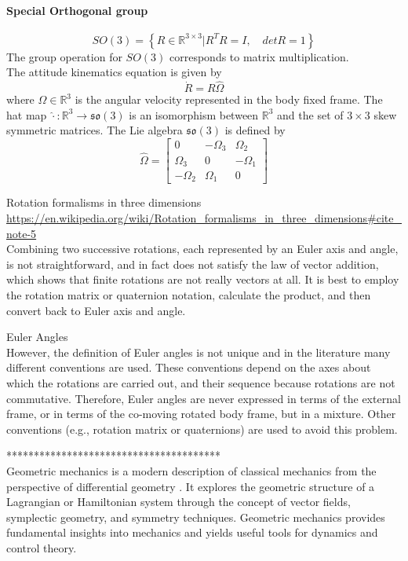 \paragraph{Special Orthogonal group}
\begin{equation}\label{key}
SO(3)=\left\lbrace R\in\mathbb{R}^{3\times3}|R^TR=I,\quad detR=1\right\rbrace 
\end{equation}
The group operation for $ SO(3) $ corresponds to matrix multiplication.\\
The attitude kinematics equation is given by
\begin{equation}\label{key}
\dot{R}=R\hat{\Omega}
\end{equation}
where $ \Omega\in\mathbb{R}^3 $ is the angular velocity represented in the body fixed frame. The hat map $ \hat{\cdot}:\mathbb{R}^3\rightarrow \mathfrak{so}(3)$ is an isomorphism between $ \mathbb{R}^3 $ and the set of $ 3\times 3 $ skew symmetric matrices. The Lie algebra $ \mathfrak{so}(3) $ is defined by
\begin{equation}\label{key}
\hat{\Omega}=\begin{bmatrix}
0&-\Omega_3&\Omega_2\\
\Omega_3&0&-\Omega_1\\
-\Omega_2&\Omega_1&0
\end{bmatrix}
\end{equation}

Rotation formalisms in three dimensions \url{https://en.wikipedia.org/wiki/Rotation_formalisms_in_three_dimensions#cite_note-5}\\
Combining two successive rotations, each represented by an Euler axis and angle, is not straightforward, and in fact does not satisfy the law of vector addition, which shows that finite rotations are not really vectors at all. It is best to employ the rotation matrix or quaternion notation, calculate the product, and then convert back to Euler axis and angle.

Euler Angles\\
However, the definition of Euler angles is not unique and in the literature many different conventions are used. These conventions depend on the axes about which the rotations are carried out, and their sequence because rotations are not commutative. Therefore, Euler angles are never expressed in terms of the external frame, or in terms of the co-moving rotated body frame, but in a mixture. Other conventions (e.g., rotation matrix or quaternions) are used to avoid this problem.

***************************************\\
Geometric mechanics is a modern description of classical mechanics from the perspective of differential geometry \cite{Bullo2005,Jurdjevic1997}. It explores the geometric structure of a Lagrangian or Hamiltonian system through the concept of vector fields, symplectic geometry, and symmetry techniques. Geometric mechanics provides fundamental insights into mechanics and yields useful tools for dynamics and control theory.

